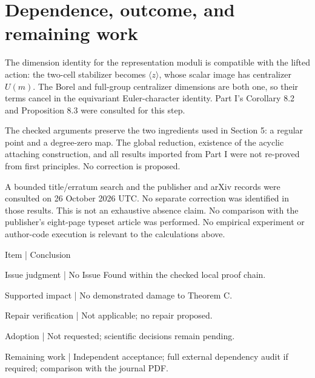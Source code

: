 \documentclass[10pt]{article}
\begin{document}
\section*{Dependence, outcome, and remaining work}
The dimension identity for the representation moduli is compatible with the lifted action: the two-cell stabilizer becomes \(\langle z\rangle\), whose scalar image has centralizer \(U(m)\). The Borel and full-group centralizer dimensions are both one, so their terms cancel in the equivariant Euler-character identity. Part I’s Corollary 8.2 and Proposition 8.3 were consulted for this step.\par
The checked arguments preserve the two ingredients used in Section 5: a regular point and a degree-zero map. The global reduction, existence of the acyclic attaching construction, and all results imported from Part I were not re-proved from first principles. No correction is proposed.\par
A bounded title/erratum search and the publisher and arXiv records were consulted on 26 October 2026 UTC. No separate correction was identified in those results. This is not an exhaustive absence claim. No comparison with the publisher’s eight-page typeset article was performed. No empirical experiment or author-code execution is relevant to the calculations above.\par
Item | Conclusion\par
Issue judgment | No Issue Found within the checked local proof chain.\par
Supported impact | No demonstrated damage to Theorem C.\par
Repair verification | Not applicable; no repair proposed.\par
Adoption | Not requested; scientific decisions remain pending.\par
Remaining work | Independent acceptance; full external dependency audit if required; comparison with the journal PDF.\par
\end{document}
